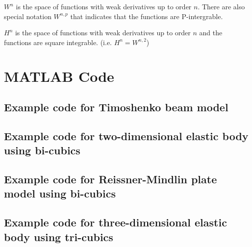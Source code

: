 \documentclass[main.tex]{subfiles}
\begin{document}
$W^n$ is the space of functions with weak derivatives up to order $n$. There are also special notation $W^{n,p}$ that indicates that the functions are P-intergrable. 

$H^n$ is the space of functions with weak derivatives up to order $n$ and the functions are square integrable. (i.e. $H^n = W^{n,2}$)

\chapter*{MATLAB Code}
\section*{Example code for Timoshenko beam model}


\section*{Example code for two-dimensional elastic body using bi-cubics}


\section*{Example code for Reissner-Mindlin plate model using bi-cubics}


\section*{Example code for three-dimensional elastic body using tri-cubics}

\end{document}
